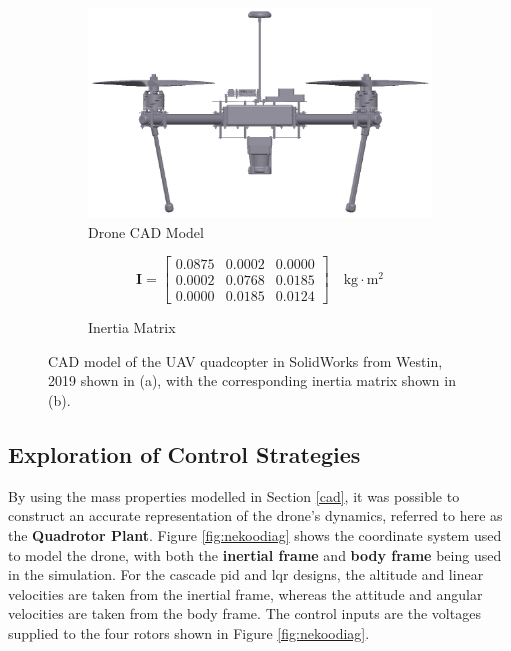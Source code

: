 \begin{figure}[H]
    \centering
    \begin{subfigure}[b]{0.5\textwidth} %
        \centering
        \includegraphics[width=\textwidth]{figs/Samuel/Figures/drone_new2 (cropped) (pdfresizer.com).pdf}
        \caption{Drone CAD Model}
        \label{fig:2a}
    \end{subfigure}
    \hspace{0.01\textwidth}
    \begin{subfigure}[b]{0.3\textwidth} %
        \centering
        \begin{equation*}
            \mathbf{I} =
            \begin{bmatrix}
                0.0875& 0.0002 & 0.0000 \\
                0.0002 & 0.0768 & 0.0185 \\
               0.0000 & 0.0185 & 0.0124
            \end{bmatrix} \quad \text{kg} \cdot \text{m}^2
        \end{equation*}
        \caption{Inertia Matrix}
        \label{fig:2b}
    \end{subfigure}
    \caption[CAD model of the UAV]{CAD model of the UAV quadcopter in SolidWorks from Westin, 2019 \cite{westin2019x4} shown in (a), with the corresponding inertia matrix shown in (b).}
    \label{fig:dronecad}
\end{figure}


\subsection{Exploration of Control Strategies}

By using the mass properties modelled in Section \ref{cad}, it was possible to construct an accurate representation of the drone's dynamics, referred to here as the \textbf{Quadrotor Plant}. Figure \ref{fig:nekoodiag} shows the coordinate system used to model the drone, with both the \textbf{inertial frame} and \textbf{body frame} being used in the simulation. For the cascade \gls{pid} and \gls{lqr} designs, the altitude and linear velocities are taken from the inertial frame, whereas the attitude and angular velocities are taken from the body frame. The control inputs are the voltages supplied to the four rotors shown in Figure \ref{fig:nekoodiag}.


